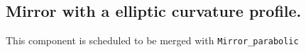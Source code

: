 \subsection*{Mirror with a elliptic curvature profile.}

This component is scheduled to be merged with \texttt{Mirror\_parabolic}

